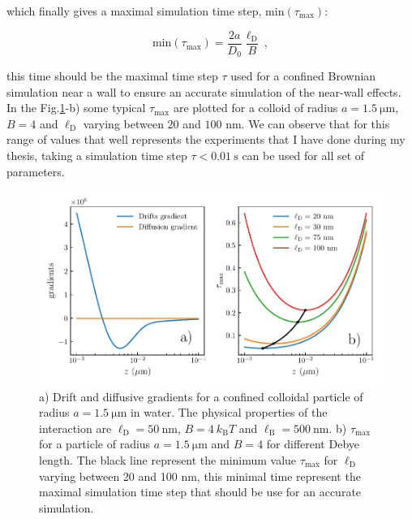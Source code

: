 which finally gives a maximal simulation time step, $\mathrm{min}(\tau_\mathrm{max})$:

\begin{equation}
	\mathrm{min}(\tau_\mathrm{max}) =  \frac{2 a}{D_0} \frac{\ell_\mathrm{D}}{B} ~,
\end{equation}

this time should be the maximal time step $\tau$ used for a confined Brownian simulation near a wall to ensure an accurate simulation of the near-wall effects. In the Fig.\ref{fig.taumax}-b) some typical $\tau_{\mathrm{max}}$ are plotted for a colloid of radius $a=1.5 ~\mathrm{\mu m}$, $B = 4$ and $\ell _\mathrm{D}$ varying between $20$ and $100$ nm. We can observe that for this range of values that well represents the experiments that I have done during my thesis, taking a simulation time step $\tau < 0.01 ~ \mathrm{s}$ can be used for all set of parameters.


\begin{figure}[ht]
	\centering
	\includegraphics{02_body/chapter3/images/simulation_confined_Brownian_motion/maximal_tau.pdf}
	\caption{a) Drift and diffusive gradients for a confined colloidal particle of radius $a = 1.5 ~\mathrm{\mu m}$ in water. The physical properties of the interaction are $\ell_\mathrm{D} = 50 ~ \mathrm{nm}$, $B = 4 ~k_\mathrm{B}T$ and $\ell_\mathrm{B} = 500 ~ \mathrm{nm}$. b) $\tau_\mathrm{max}$ for a particle of radius $a = 1.5 ~\mathrm{\mu m}$ and $B = 4$ for different Debye length. The black line represent the minimum value $\tau_\mathrm{max}$ for $\ell_\mathrm{D}$ varying between 20 and 100 nm, this minimal time represent the maximal simulation time step that should be use for an accurate simulation.} 
	\label{fig.taumax}
\end{figure}


